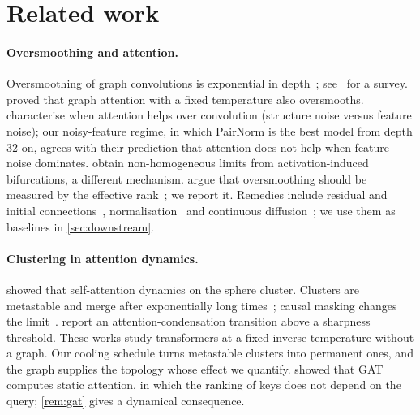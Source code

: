 \documentclass[10pt]{article}
\theoremstyle{definition}
\theoremstyle{remark}
\begin{document}
\section{Related work}\label{sec:related}

\paragraph{Oversmoothing and attention.}
Oversmoothing of graph convolutions is exponential in depth~\citep{li2018,oono2020,cai2020}; see~\citet{rusch2023} for a
survey. \citet{wu2023} proved that graph attention with a fixed temperature also oversmooths. \citet{ma2025} characterise
when attention helps over convolution (structure noise versus feature noise); our noisy-feature regime, in which PairNorm is the best model
from depth 32 on, agrees with their prediction that attention does not help when feature noise dominates. \citet{turan2026} obtain non-homogeneous limits from activation-induced bifurcations, a different
mechanism. \citet{zhang2026} argue that oversmoothing should be measured by the effective rank~\citep{roy2007}; we report it.
Remedies include residual and initial connections~\citep{chen2020gcnii,klicpera2019}, normalisation~\citep{zhao2020pairnorm} and
continuous diffusion~\citep{chamberlain2021}; we use them as baselines in \cref{sec:downstream}.

\paragraph{Clustering in attention dynamics.}
\citet{geshkovski2023} showed that self-attention dynamics on the sphere cluster. Clusters are metastable and merge after
exponentially long times~\citep{geshkovski2024metastable,bruno2025}; causal masking changes the limit~\citep{karagodin2024}.
\citet{gao2026} report an attention-condensation transition above a sharpness threshold. These works study transformers at a
fixed inverse temperature without a graph. Our cooling schedule turns metastable clusters into permanent ones, and the graph
supplies the topology whose effect we quantify. \citet{brody2022} showed that GAT computes static attention, in which the ranking of keys
does not depend on the query; \cref{rem:gat} gives a dynamical consequence.
\end{document}
